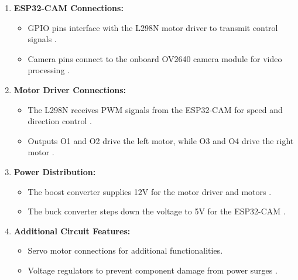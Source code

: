 \documentclass[12pt,a4paper]{report}
\begin{document}
\begin{enumerate}
    \item \textbf{ESP32-CAM Connections:}
    \begin{itemize}
        \item GPIO pins interface with the L298N motor driver to transmit control signals \cite{esp32cam}.
        \item Camera pins connect to the onboard OV2640 camera module for video processing \cite{esp32cam}.
    \end{itemize}
    
    \item \textbf{Motor Driver Connections:}
    \begin{itemize}
        \item The L298N receives PWM signals from the ESP32-CAM for speed and direction control \cite{circuitdesign}.
        \item Outputs O1 and O2 drive the left motor, while O3 and O4 drive the right motor \cite{circuitdesign}.
    \end{itemize}
    
    \item \textbf{Power Distribution:}
    \begin{itemize}
        \item The boost converter supplies 12V for the motor driver and motors \cite{circuitdesign}.
        \item The buck converter steps down the voltage to 5V for the ESP32-CAM \cite{circuitdesign}.
    \end{itemize}
    
    \item \textbf{Additional Circuit Features:}
    \begin{itemize}
        \item Servo motor connections for additional functionalities.
        \item Voltage regulators to prevent component damage from power surges \cite{circuitdesign}.
    \end{itemize}





\end{enumerate}
\end{document}
